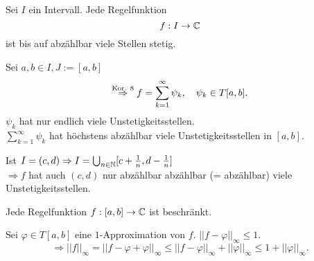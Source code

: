 \documentclass[../ana2.tex]{subfiles}
\begin{document}
\begin{kor}
    Sei \(I\) ein Intervall. Jede Regelfunktion 
    \[ f:I\rightarrow \mathbb{C} \]
    ist bis auf abzählbar viele Stellen stetig.
\end{kor}
\begin{bew}
    Sei \( a,b \in I, J := [a,b] \)
    \[ \overset{\text{Kor. 8}}{\Rightarrow} f 
    = \sum_{k=1}^\infty \psi_k
    , \quad \psi_k \in T[a,b]. \]
    \( \psi_k \) hat nur endlich viele 
    Unstetigkeitsstellen.\\
    \( \sum_{k=1}^\infty \psi_k \) hat höchstens abzählbar viele 
    Unstetigkeitsstellen in \( [a,b] \).
    
    Ist \( I = (c,d) \Rightarrow I 
    = \bigcup_{n\in\mathbb{N}} 
    [c + \frac{1}{n}, d - \frac{1}{n}] \) \\
    \( \Rightarrow f\) hat auch \( (c,d) \) nur abzählbar 
    abzählbar (= abzählbar) viele Unstetigkeitsstellen.
\end{bew}
\begin{kor}
    Jede Regelfunktion \( f:[a,b]\rightarrow \mathbb{C} \) 
    ist beschränkt. 
\end{kor}
\begin{bew}
    Sei \( \varphi \in T[a,b] \) eine \(1\)-Approximation 
    von \( f \). \( ||f - \varphi||_\infty \leq 1 \).
    \[ \Rightarrow ||f||_\infty 
    = || f - \varphi + \varphi ||_\infty 
    \leq ||f - \varphi||_\infty + ||\varphi||_\infty 
    \leq 1 + ||\varphi||_\infty. \]
\end{bew}
\end{document}
